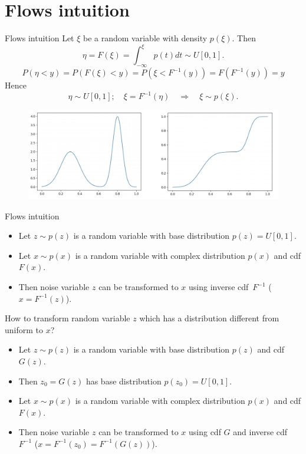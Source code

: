 \section{Flows intuition}
\begin{frame}{Flows intuition}
	Let $\xi$ be a random variable with density $p(\xi)$. Then
	\[
	\eta = F(\xi) = \int_{-\infty}^\xi p(t)dt \sim U[0, 1].
	\]
	\[
	P(\eta < y) = P(F(\xi) < y) = P(\xi < F^{-1}(y)) = F(F^{-1}(y)) = y
	\]
	Hence
	\[
	\eta \sim U[0, 1]; \quad \xi = F^{-1}(\eta) \quad \Rightarrow \quad \xi \sim p(\xi).
	\]
	\begin{figure}
		\includegraphics[width=\linewidth]{figs/flows_1d}
	\end{figure}
	
\end{frame}
\begin{frame}{Flows intuition}
	\begin{itemize}
		\item Let $z \sim p(z)$ is a random variable with base distribution $p(z) = U[0, 1]$. 
		\item Let $x \sim p(x)$ is a random variable with complex distribution $p(x)$ and cdf $F(x)$. 
		\item Then noise variable $z$ can be transformed to $x$ using inverse cdf~$F^{-1}$ ($x = F^{-1}(z)$).
	\end{itemize}
	How to transform random variable $z$  which has a distribution different from uniform to $x$?
	\begin{itemize}
		\item Let $z \sim p(z)$ is a random variable with base distribution $p(z)$ and cdf $G(z)$.
		\item Then $z_0 = G(z)$ has base distribution $p(z_0) = U[0, 1]$.
		\item Let $x \sim p(x)$ is a random variable with complex distribution $p(x)$ and cdf $F(x)$. 
		\item Then noise variable $z$ can be transformed to $x$ using cdf $G$ and inverse cdf~$F^{-1}$ ($x = F^{-1}(z_0) = F^{-1}(G(z))$).
	\end{itemize}
\end{frame}
